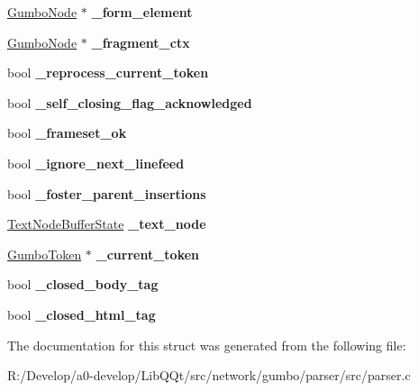 \begin{DoxyCompactItemize}
\mbox{\hyperlink{gumbo_8h_a5f67d8397fda8fb7c90cc27f14ac4e7d}{Gumbo\+Node}} $\ast$ {\bfseries \+\_\+form\+\_\+element}
\item 
\mbox{\label{struct_gumbo_internal_parser_state_af93404d94012a3e54630978342c0c95a}} 
\mbox{\hyperlink{gumbo_8h_a5f67d8397fda8fb7c90cc27f14ac4e7d}{Gumbo\+Node}} $\ast$ {\bfseries \+\_\+fragment\+\_\+ctx}
\item 
\mbox{\label{struct_gumbo_internal_parser_state_a459043bdf0d4abfa9e958efbc134dedf}} 
bool {\bfseries \+\_\+reprocess\+\_\+current\+\_\+token}
\item 
\mbox{\label{struct_gumbo_internal_parser_state_a4866a29d9707575a5b2df25e470e92c0}} 
bool {\bfseries \+\_\+self\+\_\+closing\+\_\+flag\+\_\+acknowledged}
\item 
\mbox{\label{struct_gumbo_internal_parser_state_aabe7a63e24b8916be8f60ee4d5890786}} 
bool {\bfseries \+\_\+frameset\+\_\+ok}
\item 
\mbox{\label{struct_gumbo_internal_parser_state_a6f18560cf71bdf1bb9b7bd3047aa0522}} 
bool {\bfseries \+\_\+ignore\+\_\+next\+\_\+linefeed}
\item 
\mbox{\label{struct_gumbo_internal_parser_state_aa6f655fc2f9ea332e312b98da1759e49}} 
bool {\bfseries \+\_\+foster\+\_\+parent\+\_\+insertions}
\item 
\mbox{\label{struct_gumbo_internal_parser_state_aa4b75bfb9ca741cd266c58a365bc1abe}} 
\mbox{\hyperlink{struct___text_node_buffer_state}{Text\+Node\+Buffer\+State}} {\bfseries \+\_\+text\+\_\+node}
\item 
\mbox{\label{struct_gumbo_internal_parser_state_a724459b5e071a6854939b721a7c96c90}} 
\mbox{\hyperlink{struct_gumbo_internal_token}{Gumbo\+Token}} $\ast$ {\bfseries \+\_\+current\+\_\+token}
\item 
\mbox{\label{struct_gumbo_internal_parser_state_a26c0987ba2043067cc8de8d9fe602cde}} 
bool {\bfseries \+\_\+closed\+\_\+body\+\_\+tag}
\item 
\mbox{\label{struct_gumbo_internal_parser_state_a61efb3aa1033aeb9b60339d75040ff8d}} 
bool {\bfseries \+\_\+closed\+\_\+html\+\_\+tag}
\end{DoxyCompactItemize}


The documentation for this struct was generated from the following file\+:\begin{DoxyCompactItemize}
\item 
R\+:/\+Develop/a0-\/develop/\+Lib\+Q\+Qt/src/network/gumbo/parser/src/parser.\+c\end{DoxyCompactItemize}
